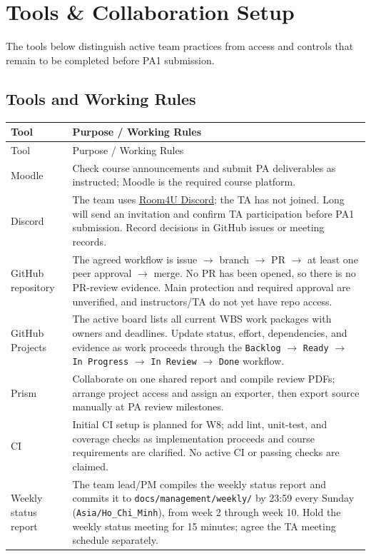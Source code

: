 \section{Tools \& Collaboration Setup}

The tools below distinguish active team practices from access and controls that remain to be completed before PA1 submission.

\subsection{Tools and Working Rules}
\small
\setlength{\tabcolsep}{4pt}
\begin{longtable}{@{}>{\raggedright\arraybackslash\setlength{\parindent}{0pt}\setlength{\parskip}{0pt}\hyphenpenalty=10000\relax}p{}>{\raggedright\arraybackslash\setlength{\parindent}{0pt}\setlength{\parskip}{0pt}\hyphenpenalty=10000\relax}p{}@{}}
\toprule
Tool & Purpose / Working Rules \\
\midrule
\endfirsthead
\toprule
Tool & Purpose / Working Rules \\
\midrule
\endhead
\midrule
\endfoot
\bottomrule
\endlastfoot
Moodle & Check course announcements and submit PA deliverables as instructed; Moodle is the required course platform. \\
Discord & The team uses \href{https://discord.gg/jUpHKWqGJ}{Room4U Discord}; the TA has not joined. Long will send an invitation and confirm TA participation before PA1 submission. Record decisions in GitHub issues or meeting records. \\
GitHub repository & The agreed workflow is issue $\rightarrow$ branch $\rightarrow$ PR $\rightarrow$ at least one peer approval $\rightarrow$ merge. No PR has been opened, so there is no PR-review evidence. Main protection and required approval are unverified, and instructors/TA do not yet have repo access. \\
GitHub Projects & The active board lists all current WBS work packages with owners and deadlines. Update status, effort, dependencies, and evidence as work proceeds through the \texttt{Backlog} $\rightarrow$ \texttt{Ready} $\rightarrow$ \texttt{In Progress} $\rightarrow$ \texttt{In Review} $\rightarrow$ \texttt{Done} workflow. \\
Prism & Collaborate on one shared report and compile review PDFs; arrange project access and assign an exporter, then export source manually at PA review milestones. \\
CI & Initial CI setup is planned for W8; add lint, unit-test, and coverage checks as implementation proceeds and course requirements are clarified. No active CI or passing checks are claimed. \\
Weekly status report & The team lead/PM compiles the weekly status report and commits it to \texttt{docs/management/}\allowbreak\texttt{weekly/} by 23:59 every Sunday (\texttt{Asia/Ho\_Chi\_Minh}), from week 2 through week 10. Hold the weekly status meeting for 15 minutes; agree the TA meeting schedule separately. \\
\end{longtable}
\normalsize
\setlength{\tabcolsep}{5pt}

